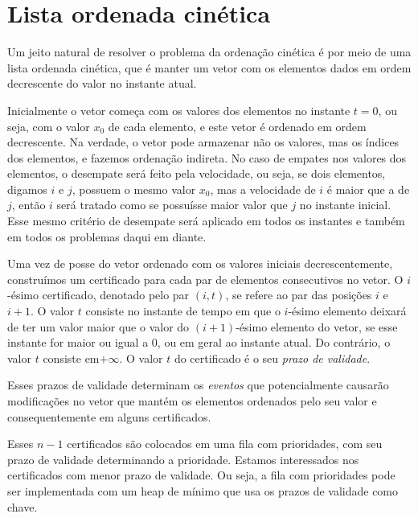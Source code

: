 


\section{Lista ordenada cinética}
\label{sec:lista}
Um jeito natural de resolver o problema da ordenação cinética é por
meio de uma lista ordenada cinética, que é manter um vetor com os
elementos dados em ordem decrescente do valor no instante atual.

Inicialmente o vetor começa com os valores dos elementos no instante
$t = 0$, ou seja, com o valor $x_0$ de cada elemento, e este vetor é
ordenado em ordem decrescente.
Na verdade, o vetor pode armazenar não os valores, mas os índices dos elementos, e fazemos ordenação
indireta.
No caso de empates nos valores dos elementos, o desempate
será feito pela velocidade, ou seja, se dois elementos, digamos $i$
e $j$, possuem o mesmo valor $x_0$, mas a velocidade de $i$ é maior
que a de $j$, então $i$ será tratado como se possuísse maior valor
que $j$ no instante inicial.
Esse mesmo critério de desempate será aplicado em todos os instantes e também em todos os problemas daqui
em diante.

Uma vez de posse do vetor ordenado com os valores iniciais
decrescentemente, construímos um certificado para cada par de
elementos consecutivos no vetor.
O $i$-ésimo certificado, denotado pelo par $(i, t)$, se refere ao par das posições $i$ e $i + 1$.
O valor $t$ consiste no instante de tempo em que o $i$-ésimo elemento
deixará de ter um valor maior que o valor do $(i + 1)$-ésimo
elemento do vetor, se esse instante for maior ou igual a 0, ou em
geral ao instante atual.
Do contrário, o valor $t$ consiste em$+\infty$.
O valor $t$ do certificado é o seu \textit{prazo de
validade}.

Esses prazos de validade determinam os \textit{eventos} que
potencialmente causarão modificações no vetor que mantém os
elementos ordenados pelo seu valor e consequentemente em alguns
certificados.

Esses $n - 1$ certificados são colocados em uma fila com
prioridades, com seu prazo de validade determinando a prioridade.
Estamos interessados nos certificados com menor prazo de validade.
Ou seja, a fila com prioridades pode ser implementada com um heap de
mínimo que usa os prazos de validade como chave.

